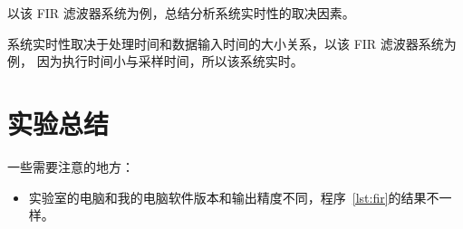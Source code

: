 \documentclass[../main]{subfiles}
\begin{document}
\begin{Exercise}
  以该 FIR 滤波器系统为例，总结分析系统实时性的取决因素。
\end{Exercise}

\begin{Answer}
  系统实时性取决于处理时间和数据输入时间的大小关系，以该 FIR 滤波器系统为例，
  因为执行时间小与采样时间，所以该系统实时。
\end{Answer}

\section{实验总结}%
\label{sec:\arabic{chapter}conclusion}

一些需要注意的地方：

\begin{itemize}
  \item 实验室的电脑和我的电脑软件版本和输出精度不同，程序~\ref{lst:fir}的结果不一样。
\end{itemize}
\end{document}

